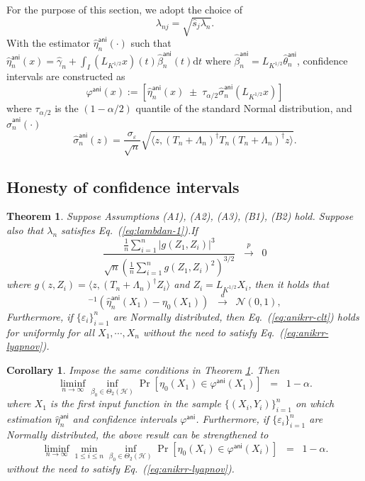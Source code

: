 \documentclass[11pt,a4paper]{article}
\renewcommand{\hat}{\widehat}
\theoremstyle{definition}
\theoremstyle{plain}
\newtheorem{theorem}{Theorem}[section]
\newtheorem{corollary}{Corollary}[section]
\theoremstyle{remark}
\newcommand{\ud}{\mathrm d}
\newcommand{\mH}{\mathcal H}
\newcommand{\ani}{\mathsf{ani}}
\begin{document}
For the purpose of this section, we adopt the choice of 
$$
\lambda_{nj} =  \sqrt{\hat s_j\lambda_n}.
$$
With the estimator $\hat\eta^\ani_n(\cdot)$ such that $\hat\eta^\ani_n(x)=\hat\gamma_n+\int_I (L_{K^{1/2}}x)(t)\hat\beta^\ani_n(t)\ud t$  where $\hat\beta_n^\ani=L_{K^{1/2}}\hat\theta_n^\ani$, confidence intervals are constructed as
$$
\varphi^\ani(x) := [\hat\eta^\ani_n(x)\;\pm\;\tau_{\alpha/2}\hat\sigma_n^\ani(L_{K^{1/2}}x)]
$$
where $\tau_{\alpha/2}$ is the $(1-\alpha/2)$ quantile of the standard Normal distribution, and $\hat\sigma_n^\ani(\cdot)$ 
$$
\hat\sigma_n^\ani(z) = \frac{\sigma_\varepsilon}{\sqrt{n}}\sqrt{\langle z, (T_n+\Lambda_n)^{\dagger}T_n(T_n+\Lambda_n)^\dagger z\rangle}.
$$

\subsection{Honesty of confidence intervals}

\begin{theorem}
Suppose Assumptions (A1), (A2), (A3), (B1), (B2) hold. Suppose also that $\lambda_n$ satisfies Eq.~(\ref{eq:lambdan-1}).If 
\begin{equation}
\frac{\frac{1}{n}\sum_{i=1}^n |g(Z_1,Z_i)|^3}{\sqrt{n}(\frac{1}{n}\sum_{i=1}^n g(Z_1,Z_i)^2)^{3/2}}\;\;\overset{p}{\to}\;\; 0
\label{eq:anikrr-lyapnov}
\end{equation}
where $g(z,Z_i)=\langle z,(T_n+\Lambda_n)^{\dagger}Z_i\rangle$ and $Z_i=L_{K^{1/2}}X_i$, then it holds that
\begin{equation}
[\hat\sigma_n^\ani(Z_1)]^{-1}(\hat\eta_n^\ani(X_1)-\eta_0(X_1)) \;\;\overset{d}{\to}\;\;\mathcal N(0,1),
\label{eq:anikrr-clt}
\end{equation}
Furthermore, if $\{\varepsilon_i\}_{i=1}^n$ are Normally distributed, then Eq.~(\ref{eq:anikrr-clt}) holds for \emph{uniformly} for all $X_1,\cdots,X_n$ without the need to satisfy Eq.~(\ref{eq:anikrr-lyapnov}).
\label{thm:anikrr-limiting}
\end{theorem}

\begin{corollary}
Impose the same conditions in Theorem \ref{thm:anikrr-limiting}. Then 
$$
\liminf_{n\to\infty}\inf_{\beta_0\in\Theta_2(\mH)}\Pr[\eta_0(X_1)\in\varphi^\ani(X_1)] \;\; = \;\; 1-\alpha.
$$
where $X_1$ is the first input function in the sample $\{(X_i,Y_i)\}_{i=1}^n$ on which estimation $\hat\eta_n^{\ani}$ and confidence intervals $\varphi^\ani$.
Furthermore, if $\{\varepsilon_i\}_{i=1}^n$ are Normally distributed, the above result can be strengthened to
$$
\liminf_{n\to\infty}\min_{1\leq i\leq n}\inf_{\beta_0\in\Theta_2(\mH)}\Pr[\eta_0(X_i)\in\varphi^\ani(X_i)] \;\; = \;\; 1-\alpha.
$$
without the need to satisfy Eq.~(\ref{eq:anikrr-lyapnov}).
\label{cor:anikrr-ci}
\end{corollary}
\end{document}
